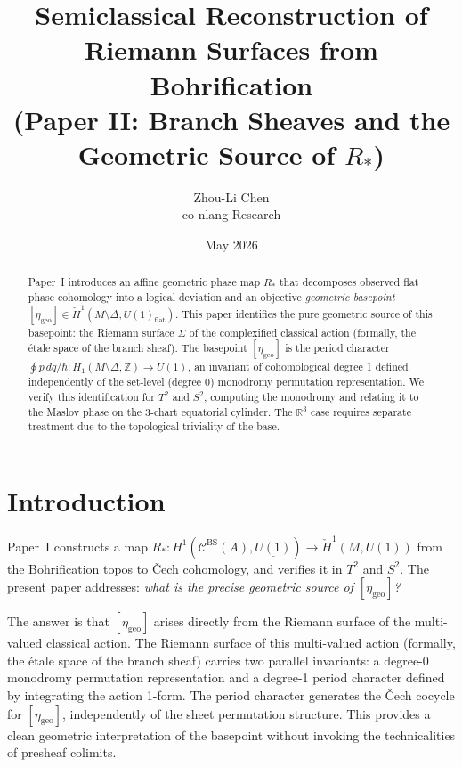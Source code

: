 \documentclass[11pt]{article}
\title{Semiclassical Reconstruction of Riemann Surfaces from Bohrification\\
{\large (Paper II: Branch Sheaves and the Geometric Source of $R_*$)}}
\author{Zhou-Li Chen \\ co-nlang Research}
\date{May 2026}
\begin{document}
\maketitle

\begin{abstract}
Paper~I \cite{PaperI} introduces an affine geometric phase map $R_*$ that decomposes observed flat phase cohomology into a logical deviation and an objective \emph{geometric basepoint} $[\eta_{\mathrm{geo}}] \in \check{H}^1(M \setminus \Delta, U(1)_{\mathrm{flat}})$. This paper identifies the pure geometric source of this basepoint: the Riemann surface $\Sigma$ of the complexified classical action (formally, the étale space of the branch sheaf). The basepoint $[\eta_{\mathrm{geo}}]$ is the period character $\oint p\,dq/\hbar : H_1(M \setminus \Delta, \mathbb{Z}) \to U(1)$, an invariant of cohomological degree 1 defined independently of the set-level (degree 0) monodromy permutation representation. We verify this identification for $T^2$ and $S^2$, computing the monodromy and relating it to the Maslov phase on the 3-chart equatorial cylinder. The $\mathbb{R}^3$ case requires separate treatment due to the topological triviality of the base.
\end{abstract}

\section{Introduction}

Paper~I constructs a map
$R_*: H^1(\mathcal{C}^{\mathrm{BS}}(A), \underline{U(1)})
\to \check{H}^1(M, U(1))$
from the Bohrification topos to Čech cohomology, and verifies it in
$T^2$ and $S^2$. The present paper addresses: \emph{what is the precise geometric source of $[\eta_{\mathrm{geo}}]$?}

The answer is that $[\eta_{\mathrm{geo}}]$ arises directly from the Riemann surface of the multi-valued classical action. The Riemann surface of this multi-valued action (formally, the \'etale space of the branch sheaf) carries two parallel invariants: a degree-0 monodromy permutation representation and a degree-1 period character defined by integrating the action 1-form. The period character generates the \v{C}ech cocycle for $[\eta_{\mathrm{geo}}]$, independently of the sheet permutation structure. This provides a clean geometric interpretation of the basepoint without invoking the technicalities of presheaf colimits.
\end{document}

